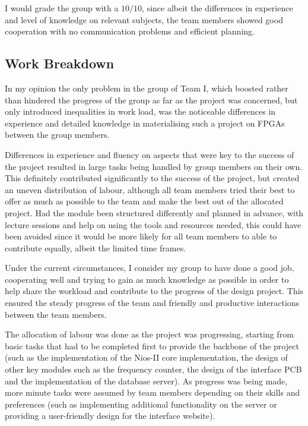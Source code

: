 I would grade the group with a $10/10$, since albeit the differences in experience and level of knowledge on relevant subjects, the team members showed good cooperation with no communication problems and efficient planning.











\subsection{Work Breakdown}
\label{sec:work_breakdown}

%

In my opinion the only problem in the group of Team I, which boosted rather than hindered the progress of the group as far as the project was concerned, but only introduced inequalities in work load, was the noticeable differences in experience and detailed knowledge in materialising such a project on FPGAs between the group members.

Differences in experience and fluency on aspects that were key to the success of the project resulted in large tasks being handled by group members on their own. This definitely contributed significantly to the success of the project, but created an uneven distribution of labour, although all team members tried their best to offer as much as possible to the team and make the best out of the allocated project. Had the module been structured differently and planned in advance, with lecture sessions and help on using the tools and resources needed, this could have been avoided since it would be more likely for all team members to able to contribute equally, albeit the limited time frames.

Under the current circumstances, I consider my group to have done a good job, cooperating well and trying to gain as much knowledge as possible in order to help share the workload and contribute to the progress of the design project. This ensured the steady progress of the team and friendly and productive interactions between the team members.

The allocation of labour was done as the project was progressing, starting from basic tasks that had to be completed first to provide the backbone of the project (such as the implementation of the Nios-II core implementation, the design of other key modules such as the frequency counter, the design of the interface PCB and the implementation of the database server). As progress was being made, more minute tasks were assumed by team members depending on their skills and preferences (such as implementing additional functionality on the server or providing a user-friendly design for the interface website).

